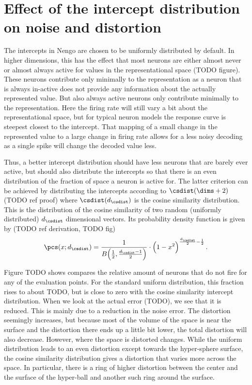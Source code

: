 \section{Effect of the intercept distribution on noise and distortion}
The intercepts in Nengo are chosen to be uniformly distributed by default.
In higher dimensions, this has the effect that most neurons are either almost never or almost always active for values in the representational space (TODO figure).
These neurons contribute only minimally to the representation as a neuron that is always in-active does not provide any information about the actually represented value.
But also always active neurons only contribute minimally to the representation.
Here the firing rate will still vary a bit about the representational space, but for typical neuron models the response curve is steepest closest to the intercept.
That mapping of a small change in the represented value to a large change in firing rate allows for a less noisy decoding as a single spike will change the decoded value less.

Thus, a better intercept distribution should have less neurons that are barely ever active, but should also distribute the intercepts so that there is an even distribution of the fraction of space a neuron is active for.
The latter criterion can be achieved by distributing the intercepts according to $\csdist(\dims+2)$ (TODO ref proof) where $\csdist(d_{\csdist})$ is the cosine similarity distribution.
This is the distribution of the cosine similarity of two random (uniformly distributed) $d_{\csdist}$ dimensional vectors.
Its probability density function is given by (TODO ref derivation, TODO fig)
\begin{equation}
\pcs(x; d_{\csdist}) = \frac{1}{B\!\del{\frac{1}{2}, \frac{d_{\csdist} - 1}{2}}} \cdot \del{1 - x^2}^{\frac{d_{\csdist}}{2} - \frac{1}{2}} \text{.}
\end{equation}

Figure TODO shows compares the relative amount of neurons that do not fire for any of the evaluation points.
For the standard uniform distribution, this fraction rises to about TODO, but is close to zero with the cosine similarity intercept distribution.
When we look at the actual error (TODO), we see that it is reduced.
This is mainly due to a reduction in the noise error.
The distortion seemingly increases, but because most of the volume of the space is near the surface and the distortion there ends up a little bit lower, the total distortion will also decrease.
However, where the space is distorted changes.
While the uniform distribution leads to an even distortion except towards the hyper-sphere surface, the cosine similarity distribution gives a distortion that varies more across the space.
In particular, there is a ring of higher distortion between the center and the surface of the hyper-ball and another such ring around the surface.

